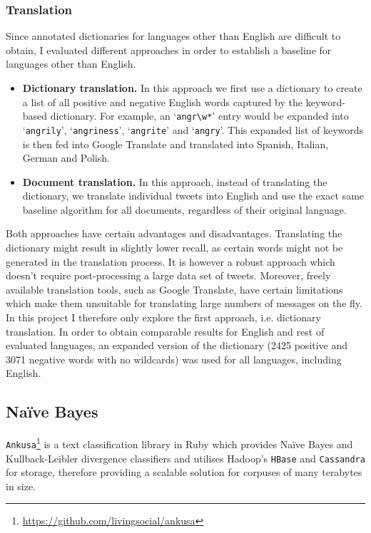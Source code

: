 \subsubsection{Translation}

Since annotated dictionaries for languages other than English are difficult to obtain, I evaluated different approaches in order to establish a baseline for languages other than English.

\begin{itemize}
  \item \textbf{Dictionary translation.} In this approach we first use a dictionary to create a list of all positive and negative English words captured by the keyword-based dictionary. For example, an `\verb|angr\w*|' entry would be expanded into `\verb|angrily|',  `\verb|angriness|', `\verb|angrite|' and `\verb|angry|'. This expanded list of keywords is then fed into Google Translate and translated into Spanish, Italian, German and Polish.

  \item \textbf{Document translation.} In this approach, instead of translating the dictionary, we translate individual tweets into English and use the exact same baseline algorithm for all documents, regardless of their original language.
\end{itemize}

Both approaches have certain advantages and disadvantages. Translating the dictionary might result in slightly lower recall, as certain words might not be generated in the translation process. It is however a robust approach which doesn't require post-processing a large data set of tweets. Moreover, freely available translation tools, such as Google Translate, have certain limitations which make them unsuitable for translating large numbers of messages on the fly. In this project I therefore only explore the first approach, i.e. dictionary translation. In order to obtain comparable results for English and rest of evaluated languages, an expanded version of the dictionary (2425 positive and 3071 negative words with no wildcards) was used for all languages, including English.

\subsection{Na\"ive Bayes}

\verb|Ankusa|\footnote{\url{https://github.com/livingsocial/ankusa}} is a text classification library in Ruby which provides Na\"ive Bayes and Kullback-Leibler divergence classifiers and utilises Hadoop's \verb|HBase| and \verb|Cassandra| for storage, therefore providing a scalable solution for corpuses of many terabytes in size.

